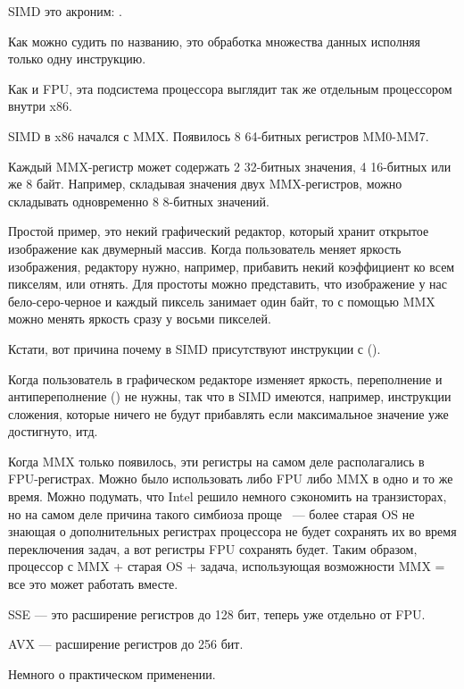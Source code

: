 
\label{SIMD_x86}
\ac{SIMD} это акроним: .

Как можно судить по названию, это обработка множества данных исполняя только одну инструкцию.

Как и \ac{FPU}, эта подсистема процессора выглядит так же отдельным процессором внутри x86.

SIMD в x86 начался с MMX. Появилось 8 64-битных регистров MM0-MM7.

Каждый MMX-регистр может содержать 2 32-битных значения, 4 16-битных или же 8 байт. 
Например, складывая значения двух MMX-регистров, можно складывать одновременно 8 8-битных значений.

Простой пример, это некий графический редактор, который хранит открытое изображение как двумерный массив. 
Когда пользователь меняет яркость изображения, редактору нужно, например, прибавить некий коэффициент 
ко всем пикселям, или отнять. 
Для простоты можно представить, что изображение у нас бело-серо-черное и каждый пиксель занимает один байт, 
то с помощью MMX можно менять яркость сразу у восьми пикселей.

Кстати, вот причина почему в SIMD присутствуют инструкции с  ().

Когда пользователь в графическом редакторе изменяет яркость, переполнение и антипереполнение ()
не нужны, так что в SIMD имеются, например, инструкции сложения, которые ничего не будут прибавлять
если максимальное значение уже достигнуто, итд.

Когда MMX только появилось, эти регистры на самом деле располагались в FPU-регистрах. 
Можно было использовать 
либо FPU либо MMX в одно и то же время. Можно подумать, что Intel решило немного сэкономить на транзисторах, 
но на самом деле причина такого симбиоза проще ~--- более старая \ac{OS} не знающая о дополнительных 
регистрах процессора не будет сохранять их во время переключения задач, а вот регистры FPU сохранять будет. 
Таким образом, процессор с MMX + старая \ac{OS} + задача, использующая возможности MMX = все 
это может работать вместе.

SSE --- это расширение регистров до 128 бит, теперь уже отдельно от FPU.

AVX --- расширение регистров до 256 бит.

Немного о практическом применении.


